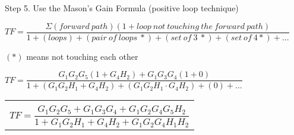 \documentclass[11pt,letterpaper]{article}
\begin{document}
Step 5. Use the Mason’s Gain Formula (positive loop technique)\\
\begin{center}
	$TF=\dfrac{\Sigma (forward~path)(1 + loop~not~touching~the~forward~path)}{1 + (loops) + (pair~of~loops~*) + (set~of~3~*) + (set~of~4*) + ...}$
\end{center}
$(*)$ means not touching each other\\
\begin{center}
	$TF=\dfrac{G_1G_2G_5(1+G_4H_2)+G_1G_3G_4(1+0)}{1+(G_1G_2H_1+G_4H_2)+(G_1G_2H_1\cdot G_4H_2)+(0)+...}$\\[12pt]
	\begin{tabular}{|c|}
		\hline \\
	$TF=\dfrac{G_1G_2G_5+G_1G_3G_4+G_1G_2G_4G_5H_2}{1+G_1G_2H_1+G_4H_2+G_1G_2G_4H_1H_2}$\\[12pt]
	\hline
	\end{tabular}
\end{center}

\vspace{12pt}

\clearpage
\end{document}
